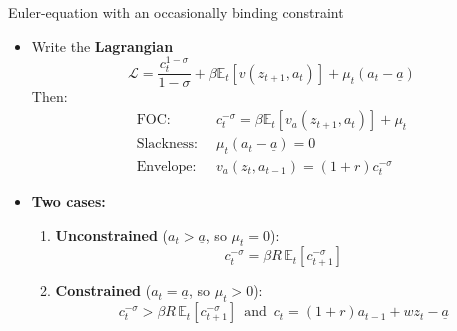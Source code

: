 \documentclass[
  10pt,
  ignorenonframetext,
  aspectratio=43,
  english,
  handout]{beamer}
\providecommand{\tightlist}{%
  \setlength{\itemsep}{0pt}\setlength{\parskip}{0pt}}
\begin{document}
\begin{frame}{Euler-equation with an occasionally binding constraint}
\protect{}\label{euler-equation-with-an-occasionally-binding-constraint}
\begin{itemize}
\item
  Write the \textbf{Lagrangian} \[
    \mathcal{L}=\frac{c_{t}^{1-\sigma}}{1-\sigma}  +\beta \mathbb{E}_{t}\left[v(z_{t+1},a_{t})\right]+\mu_{t}(a_{t}-\underline{a})
    \] Then: \[
    \begin{aligned}
    \text{FOC:} & \,\,\,c^{-\sigma}_{t}=\beta\mathbb{E}_{t}\left[v_{a}(z_{t+1},a_{t})\right]+\mu_{t}\\
    \text{Slackness:} & \,\,\,\mu_{t}\left(a_{t}-\underline{a}\right)=0\\
    \text{Envelope:} & \,\,\,v_{a}(z_{t},a_{t-1})=(1+r)c^{-\sigma}_{t}
    \end{aligned}
    \]
\item
  \textbf{Two cases:}

  \begin{enumerate}
  \tightlist
  \item
    \textbf{Unconstrained} (\(a_{t}>\underline{a}\), so \(\mu_{t}=0\)):
    \[
     c^{-\sigma}_{t}=\beta R\,\mathbb{E}_{t}\left[c^{-\sigma}_{t+1}\right]
     \]
  \item
    \textbf{Constrained} (\(a_{t}=\underline{a}\), so \(\mu_{t}>0\)): \[
     c^{-\sigma}_{t}>\beta R\,\mathbb{E}_{t}\left[c^{-\sigma}_{t+1}\right]\,\,\,\text{and}\,\,\,c_{t}=(1+r)a_{t-1}+wz_{t}-\underline{a}
     \]
  \end{enumerate}
\end{itemize}
\end{frame}
\end{document}
